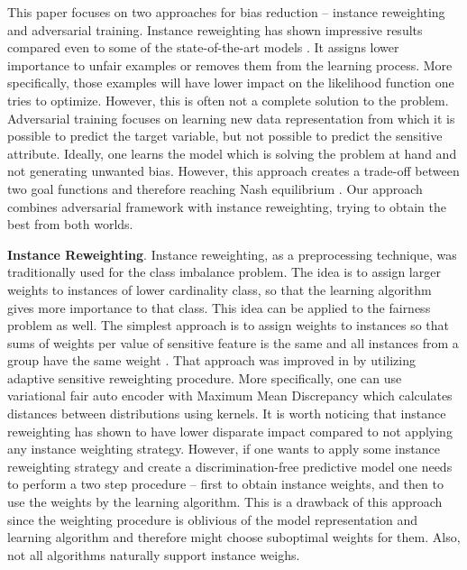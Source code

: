 \documentclass[preprint,12pt]{elsarticle}
\begin{document}
This paper focuses on two approaches for bias reduction -- instance reweighting and adversarial training. Instance reweighting has shown impressive results compared even to some of the state-of-the-art models \cite{feldman2015certifying, krasanakis2018adaptive}. It assigns lower importance to unfair examples or removes them from the learning process. More specifically, those examples will have lower impact on the likelihood function one tries to optimize. However, this is often not a complete solution to the problem. Adversarial training focuses on learning new data representation from which it is possible to predict the target variable, but not possible to predict the sensitive attribute. Ideally, one learns the model which is solving the problem at hand and not generating unwanted bias. However, this approach creates a trade-off between two goal functions and therefore reaching Nash equilibrium \cite{goodfellow2014generative}. Our approach combines adversarial framework with instance reweighting, trying to obtain the best from both worlds.

\textbf{Instance Reweighting}. Instance reweighting, as a preprocessing technique, was traditionally used for the class imbalance problem. The idea is to assign larger weights to instances of lower cardinality class, so that the learning algorithm gives more importance to that class. This idea can be applied to the fairness problem as well. The simplest approach is to assign weights to instances so that sums of weights per value of sensitive feature is the same and all instances from a group have the same weight \cite{kamiran2012data}. That approach was improved in \cite{krasanakis2018adaptive} by utilizing adaptive sensitive reweighting procedure. More specifically, one can use variational fair auto encoder with Maximum Mean Discrepancy \cite{louizos2015variational} which calculates distances between distributions using kernels. It is worth noticing that instance reweighting has shown to have lower disparate impact \cite{feldman2015certifying} compared to not applying any instance weighting strategy. However, if one wants to apply some instance reweighting strategy and create a discrimination-free predictive model one needs to perform a two step procedure -- first to obtain instance weights, and then to use the weights by the learning algorithm. This is a drawback of this approach since the weighting procedure is oblivious of the model representation and learning algorithm and therefore might choose suboptimal weights for them. Also, not all algorithms naturally support instance weighs.
\end{document}
